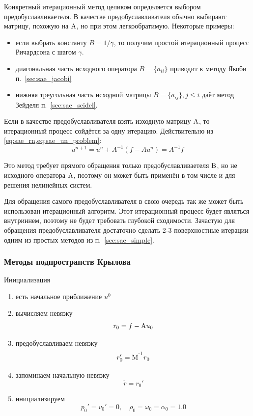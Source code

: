 Конкретный итерационный метод целиком определяется выбором предобуславливаетеля.
В качестве предобуславливателя обычно выбирают матрицу, похожую на ${\rm A}$, но при этом легкообратимую.
Некоторые примеры:
\begin{itemize}
\item если выбрать константу $B = 1/\gamma$, то получим
простой итерационный процесс Ричардсона с шагом $\gamma$.
\item диагональная часть исходного оператора $B = \{a_{ii}\}$ приводит к методу Якоби п.~\ref{sec:sae_jacobi}
\item нижняя треугольная часть исходной матрицы $B = \{a_{ij}\}, j\leq i$ даёт метод Зейделя п.~\ref{sec:sae_seidel}.
\end{itemize}

Если в качестве предобуславливателя взять изходную матрицу ${\rm A}$, 
то итерационный процесс сойдётся за одну итерацию. Действительно из \cref{eq:sae_rn,eq:sae_un_problem}:
\begin{equation*}
u^{n+1} = u^{n} + A^{-1}(f - A u^n) = A^{-1} f
\end{equation*}

Это метод требует прямого обращения только предобуславливаетеля ${\rm B}$, но не 
исходного оператора ${\rm A}$, поэтому он может быть применён в том числе и для решения нелинейных систем.

Для обращения самого предобуславливателя в свою очередь так же может
быть использован итерационный алгоритм. Этот итерационный процесс будет являться
внутриннем, поэтому не будет требовать глубокой сходимости.
Зачастую для обращения предобуславливателя достаточно сделать 2-3 поверхностные итерации
одним из простых методов из п.~\ref{sec:sae_simple}.

\subsubsection{Методы подпространств Крылова}

\label{sec:bicgstab}

Инициализация
\begin{enumerate}
\item есть начальное приближение $u^0$
\item вычисляем невязку
$$r_0 = f - {\rm A} u_0$$
\item предобуславливаем невязку
$$r_0' = {\rm M}^{\textsuperscript {-1}}r_0$$
\item запоминаем начальную невязку
$$\tilde r = r_0'$$
\item инициализируем
$$p_0' = v_0' = 0, \quad \rho_0 = \omega_0 = \alpha_0 = 1.0$$
\end{enumerate}

